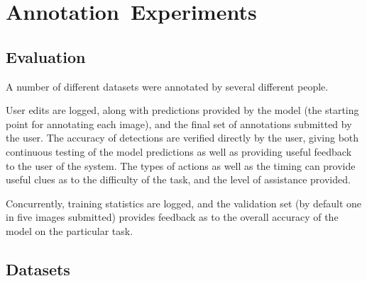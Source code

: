 \chapter{Annotation~Experiments}
\label{chap:annotation} 




\section {Evaluation}

A number of different datasets were annotated by several different people. 

User edits are logged, along with predictions provided by the model (the starting point for annotating each image), and the final set of annotations submitted by the user. The accuracy of detections are verified directly by the user, giving both continuous testing of the model predictions as well as providing useful feedback to the user of the system. The types of actions as well as the timing can provide useful clues as to the difficulty of the task, and the level of assistance provided.

Concurrently, training statistics are logged, and the validation set (by default one in five images submitted) provides feedback as to the overall accuracy of the model on the particular task.




\section{Datasets}




